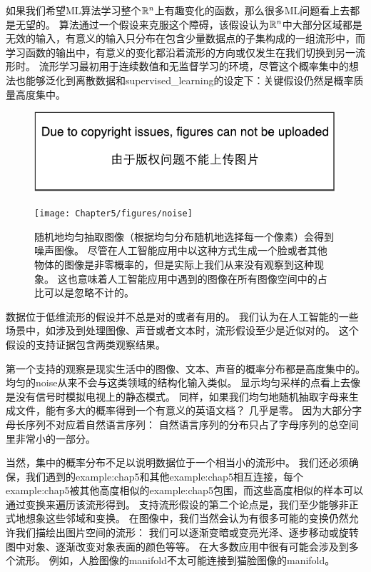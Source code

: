 如果我们希望\gls{ML}算法学习整个$\mathbb{R}^n$上有趣变化的函数，那么很多\gls{ML}问题看上去都是无望的。
算法通过一个假设来克服这个障碍，该假设认为$\mathbb{R}^n$中大部分区域都是无效的输入，有意义的输入只分布在包含少量数据点的子集构成的一组流形中，而学习函数的输出中，有意义的变化都沿着流形的方向或仅发生在我们切换到另一流形时。
流形学习最初用于连续数值和无监督学习的环境，尽管这个概率集中的想法也能够泛化到离散数据和\gls{supervised_learning}的设定下：关键假设仍然是概率质量高度集中。



\begin{figure}[!htb]
\ifOpenSource
\centerline{\includegraphics{figure.pdf}}
\else
\centerline{\texttt{[image: Chapter5/figures/noise]}}
\fi
\caption{随机地均匀抽取图像（根据均匀分布随机地选择每一个像素）会得到噪声图像。
尽管在人工智能应用中以这种方式生成一个脸或者其他物体的图像是非零概率的，但是实际上我们从来没有观察到这种现象。
这也意味着人工智能应用中遇到的图像在所有图像空间中的占比可以是忽略不计的。}
\label{fig:chap5_noise}
\end{figure}


数据位于低维流形的假设并不总是对的或者有用的。
我们认为在人工智能的一些场景中，如涉及到处理图像、声音或者文本时，流形假设至少是近似对的。
这个假设的支持证据包含两类观察结果。

第一个支持的观察是现实生活中的图像、文本、声音的概率分布都是高度集中的。
均匀的\gls{noise}从来不会与这类领域的结构化输入类似。
显示均匀采样的点看上去像是没有信号时模拟电视上的静态模式。
同样，如果我们均匀地随机抽取字母来生成文件，能有多大的概率得到一个有意义的英语文档？
几乎是零。
因为大部分字母长序列不对应着自然语言序列：
自然语言序列的分布只占了字母序列的总空间里非常小的一部分。


当然，集中的概率分布不足以说明数据位于一个相当小的流形中。
我们还必须确保，我们遇到的\gls{example:chap5}和其他\gls{example:chap5}相互连接，每个\gls{example:chap5}被其他高度相似的\gls{example:chap5}包围，而这些高度相似的样本可以通过变换来遍历该流形得到。
支持流形假设的第二个论点是，我们至少能够非正式地想象这些邻域和变换。
在图像中，我们当然会认为有很多可能的变换仍然允许我们描绘出图片空间的流形：
我们可以逐渐变暗或变亮光泽、逐步移动或旋转图中对象、逐渐改变对象表面的颜色等等。
在大多数应用中很有可能会涉及到多个流形。
例如，人脸图像的\gls{manifold}不太可能连接到猫脸图像的\gls{manifold}。

